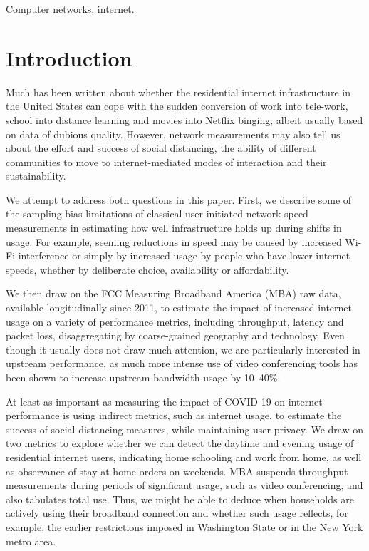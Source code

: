 \documentclass[conference,10pt]{IEEEtran}
\begin{document}
\begin{IEEEkeywords}
Computer networks, internet.
\end{IEEEkeywords}

\section{Introduction}
\label{sec:introduction}

Much has been written about whether the residential internet infrastructure in the United States can cope with the sudden conversion of work into tele-work, school into distance learning and movies into Netflix binging, albeit usually based on data of dubious quality. However, network measurements may also tell us about the effort and success of social distancing, the ability of different communities to move to internet-mediated modes of interaction and their sustainability.

We attempt to address both questions in this paper. First, we describe some of the sampling bias limitations of classical user-initiated network speed measurements in estimating how well infrastructure holds up during shifts in usage. For example, seeming reductions in speed may be caused by increased Wi-Fi interference or simply by increased usage by people who have lower internet speeds, whether by deliberate choice, availability or affordability.

We then draw on the FCC Measuring Broadband America (MBA) raw data, available longitudinally since 2011, to estimate the impact of increased internet usage on a variety of performance metrics, including throughput, latency and packet loss, disaggregating by coarse-grained geography and technology. Even though it usually does not draw much attention, we are particularly interested in upstream performance, as much more intense use of video conferencing tools has been shown to increase upstream bandwidth usage by 10--40\%.

At least as important as measuring the impact of COVID-19 on internet performance is using indirect metrics, such as internet usage, to estimate the success of social distancing measures, while maintaining user privacy. We draw on two metrics to explore whether we can detect the daytime and evening usage of residential internet users, indicating home schooling and work from home, as well as observance of stay-at-home orders on weekends. MBA suspends throughput measurements during periods of significant usage, such as video conferencing, and also tabulates total use. Thus, we might be able to deduce when households are actively using their broadband connection and whether such usage reflects, for example, the earlier restrictions imposed in Washington State or in the New York metro area.
\end{document}
